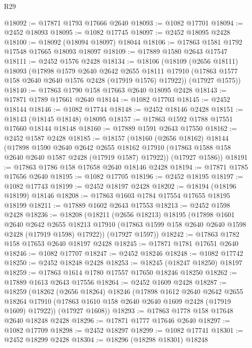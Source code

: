 \begin{lexlean}{R29}
\begin{coremodule}
@18092 := @17871 @1793 @17666 @2640
@18093 := @1082 @17701
@18094 := @2452 @18093
@18095 := @1082 @17745
@18097 := @2452 @18095 @2428
@18100 := @18092 (@18094 @18097) @18044
@18106 := @17863 @1581 @1792 @17548 @17665 @18093 @18097
@18109 := @17889 @1580 @2643 @17547
@18111 := @2452 @1576 @2428
@18134 := @18106
    (@18109
      (@2656 @18111)
      @18093
      (@17898
        @1579
        @2640
        @2642
        @2655
        @18111
        @17910
        (@17863 @1577 @158 @2640 @2640 @1576 @2428 (@17919 @1576) @17922))
      (@17927 @1575))
@18140 := @17863 @1790 @158 @17663 @2640 @18095 @2428
@18143 := @17871 @1789 @17661 @2640
@18144 := @1082 @17703
@18145 := @2452 @18144
@18146 := @1082 @17744
@18148 := @2452 @18146 @2428
@18151 := @18143 (@18145 @18148) @18095
@18157 := @17863 @1592 @1788 @17551 @17660 @18144 @18148
@18160 := @17889 @1591 @2643 @17550
@18162 := @2452 @1587 @2428
@18185 := @18157
    (@18160
      (@2656 @18162)
      @18144
      (@17898
        @1590
        @2640
        @2642
        @2655
        @18162
        @17910
        (@17863 @1588 @158 @2640 @2640 @1587 @2428 (@17919 @1587) @17922))
      (@17927 @1586))
@18191 := @17863 @1786 @158 @17658 @2640 @18146 @2428
@18194 := @17871 @1785 @17656 @2640
@18195 := @1082 @17705
@18196 := @2452 @18195
@18197 := @1082 @17743
@18199 := @2452 @18197 @2428
@18202 := @18194 (@18196 @18199) @18146
@18208 := @17863 @1603 @1784 @17554 @17655 @18195 @18199
@18211 := @17889 @1602 @2643 @17553
@18213 := @2452 @1598 @2428
@18236 := @18208
    (@18211
      (@2656 @18213)
      @18195
      (@17898
        @1601
        @2640
        @2642
        @2655
        @18213
        @17910
        (@17863 @1599 @158 @2640 @2640 @1598 @2428 (@17919 @1598) @17922))
      (@17927 @1597))
@18242 := @17863 @1782 @158 @17653 @2640 @18197 @2428
@18245 := @17871 @1781 @17651 @2640
@18246 := @1082 @17707
@18247 := @2452 @18246
@18248 := @1082 @17742
@18250 := @2452 @18248 @2428
@18253 := @18245 (@18247 @18250) @18197
@18259 := @17863 @1614 @1780 @17557 @17650 @18246 @18250
@18262 := @17889 @1613 @2643 @17556
@18264 := @2452 @1609 @2428
@18287 := @18259
    (@18262
      (@2656 @18264)
      @18246
      (@17898
        @1612
        @2640
        @2642
        @2655
        @18264
        @17910
        (@17863 @1610 @158 @2640 @2640 @1609 @2428 (@17919 @1609) @17922))
      (@17927 @1608))
@18293 := @17863 @1778 @158 @17648 @2640 @18248 @2428
@18296 := @17871 @1777 @17646 @2640
@18297 := @1082 @17709
@18298 := @2452 @18297
@18299 := @1082 @17741
@18301 := @2452 @18299 @2428
@18304 := @18296 (@18298 @18301) @18248

\end{coremodule}
\end{lexlean}
